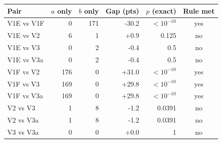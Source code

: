 \begin{tabular}{lrrrrc}
\toprule
Pair & $a$ only & $b$ only & Gap (pts) & $p$ (exact) & Rule met \\
\midrule
V1E vs V1F & 0 & 171 & -30.2 & $<10^{-10}$ & yes \\
V1E vs V2 & 6 & 1 & +0.9 & 0.125 & no \\
V1E vs V3 & 0 & 2 & -0.4 & 0.5 & no \\
V1E vs V3a & 0 & 2 & -0.4 & 0.5 & no \\
V1F vs V2 & 176 & 0 & +31.0 & $<10^{-10}$ & yes \\
V1F vs V3 & 169 & 0 & +29.8 & $<10^{-10}$ & yes \\
V1F vs V3a & 169 & 0 & +29.8 & $<10^{-10}$ & yes \\
V2 vs V3 & 1 & 8 & -1.2 & 0.0391 & no \\
V2 vs V3a & 1 & 8 & -1.2 & 0.0391 & no \\
V3 vs V3a & 0 & 0 & +0.0 & 1 & no \\
\bottomrule
\end{tabular}
